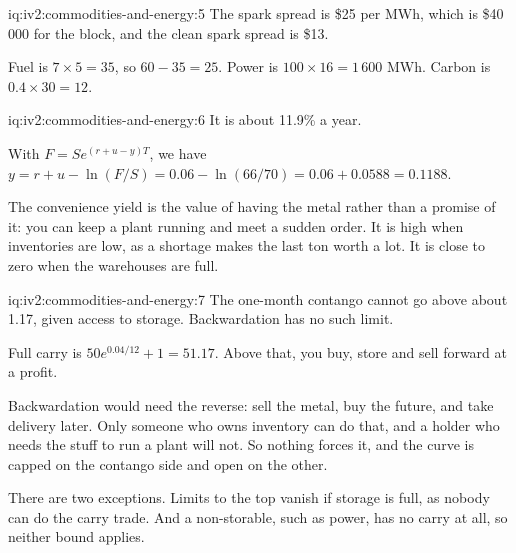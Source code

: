 \begin{solution}{iq:iv2:commodities-and-energy:5}
The spark spread is \$25 per MWh, which is \$40\,000 for the block, and the clean spark spread is \$13.

Fuel is $7 \times 5 = 35$, so $60 - 35 = 25$. Power is $100 \times 16 = 1\,600$ MWh. Carbon is $0.4 \times 30 = 12$.

\end{solution}

\begin{solution}{iq:iv2:commodities-and-energy:6}
It is about 11.9\% a year.

With $F = S e^{(r + u - y)T}$, we have $y = r + u - \ln(F/S) = 0.06 - \ln(66/70) = 0.06 + 0.0588 = 0.1188$.

The convenience yield is the value of having the metal rather than a promise of it: you can keep a plant running and meet a sudden order. It is high when inventories are low, as a shortage makes the last ton worth a lot. It is close to zero when the warehouses are full.

\end{solution}

\begin{solution}{iq:iv2:commodities-and-energy:7}
The one-month contango cannot go above about 1.17, given access to storage. Backwardation has no such limit.

Full carry is $50e^{0.04/12} + 1 = 51.17$. Above that, you buy, store and sell forward at a profit.

Backwardation would need the reverse: sell the metal, buy the future, and take delivery later. Only someone who owns inventory can do that, and a holder who needs the stuff to run a plant will not. So nothing forces it, and the curve is capped on the contango side and open on the other.

There are two exceptions. Limits to the top vanish if storage is full, as nobody can do the carry trade. And a non-storable, such as power, has no carry at all, so neither bound applies.

\end{solution}

